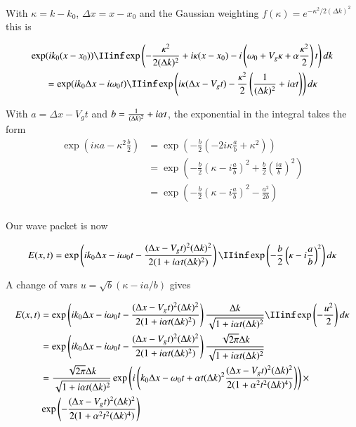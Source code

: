 With $\kappa = k - k_0$, $\Delta x = x -x_0$ and the Gaussian weighting $f(\kappa) = e^{-\kappa^2/2(\Delta k)^2}$ this is

\begin{align*}
\exp&( i k_0 (x-x_0) )
\IIinf 
\exp\left( -\frac{\kappa^2}{2(\Delta k)^2} +i \kappa (x-x_0) 
- i \left(\omega_0 + V_g \kappa + \alpha \frac{\kappa^2}{2} \right) t\right) dk \\
&=
\exp( i k_0 \Delta x -i \omega_0 t)
\IIinf 
\exp\left( 
i \kappa ( \Delta x - V_g t )
-\frac{\kappa^2}{2} \left(\inv{(\Delta k)^2} + i \alpha t \right)
\right) d\kappa \\
\end{align*}

With $a = \Delta x - V_g t$ and $b = \frac{1}{(\Delta k)^2} + i \alpha t$, the exponential in the integral takes the form
\begin{align*}
\exp\left( i \kappa a - \kappa^2 \frac{b}{2} \right) 
&= \exp\left( - \frac{b}{2}\left(-2 i \kappa \frac{a}{b} + \kappa^2 \right) \right)  \\
&= \exp\left( - \frac{b}{2}\left( \kappa - i \frac{a}{b} \right)^2 + \frac{b}{2}\left(\frac{ia}{b}\right)^2 \right)  \\
&= \exp\left( - \frac{b}{2}\left( \kappa - i \frac{a}{b} \right)^2 - \frac{a^2}{2b} \right)  \\
\end{align*}

Our wave packet is now

\begin{align*}
E(x,t) 
&= \exp\left( i k_0 \Delta x -i \omega_0 t - \frac{( \Delta x - V_g t)^2 (\Delta k)^2}{2(1 + i \alpha t (\Delta k)^2)} \right)
\IIinf 
\exp\left( - \frac{b}{2}\left( \kappa - i \frac{a}{b} \right)^2 \right) 
d\kappa \\
\end{align*}

A change of vars $u = \sqrt{b}(\kappa - ia/b)$ gives

\begin{align*}
E(x,t) 
&= \exp\left( i k_0 \Delta x -i \omega_0 t - \frac{( \Delta x - V_g t)^2 (\Delta k)^2}{2(1 + i \alpha t (\Delta k)^2)} \right)
\frac{\Delta k}{\sqrt{1 + i \alpha t (\Delta k)^2}}
\IIinf \exp\left( - \frac{u^2}{2} \right) d\kappa \\
&= \exp\left( i k_0 \Delta x -i \omega_0 t - \frac{( \Delta x - V_g t)^2 (\Delta k)^2}{2(1 + i \alpha t (\Delta k)^2)} \right)
\frac{\sqrt{2\pi}\Delta k}{\sqrt{1 + i \alpha t (\Delta k)^2}} \\
&= 
\frac{\sqrt{2\pi}\Delta k}{\sqrt{1 + i \alpha t (\Delta k)^2}} 
\exp\left( i \left(k_0 \Delta x - \omega_0 t
+ 
\alpha t (\Delta k)^2 \frac{( \Delta x - V_g t)^2 (\Delta k)^2}{2(1 + \alpha^2 t^2 (\Delta k)^4)} 
\right) \right) \times \\
&\exp\left(
- 
\frac{( \Delta x - V_g t)^2 (\Delta k)^2}{2(1 + \alpha^2 t^2 (\Delta k)^4)} 
\right) \\
\end{align*}

